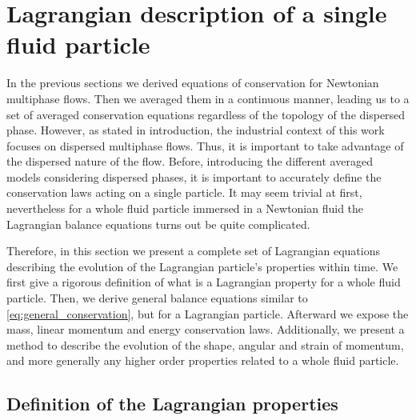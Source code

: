 \section{Lagrangian description of a single fluid particle}
\label{sec:Lagrangian_desc}

In the previous sections we derived equations of conservation for Newtonian multiphase flows. 
Then we averaged them in a continuous manner, leading us to a set of averaged conservation equations regardless of the topology of the dispersed phase. 
However, as stated in introduction, the industrial context of this work focuses on dispersed multiphase flows. 
Thus, it is important to take advantage of the dispersed nature of the flow. 
Before, introducing the different averaged models considering dispersed phases, it is important to accurately define the conservation laws acting on a single particle. 
It may seem trivial at first, nevertheless for a whole fluid particle immersed in a Newtonian fluid the Lagrangian balance equations turns out be quite complicated. 

Therefore, in this section we present a complete set of Lagrangian equations describing the evolution of the Lagrangian particle's properties within time. 
We first give a rigorous definition of what is a Lagrangian property for a whole fluid particle. 
Then, we derive general balance equations similar to \ref{eq:general_conservation}, but for a Lagrangian particle. 
Afterward we expose the mass, linear momentum and energy conservation laws.
Additionally, we present a method to describe the evolution of the shape, angular and strain of momentum, and more generally any higher order properties related to a whole fluid particle. 

\subsection{Definition of the Lagrangian properties}

